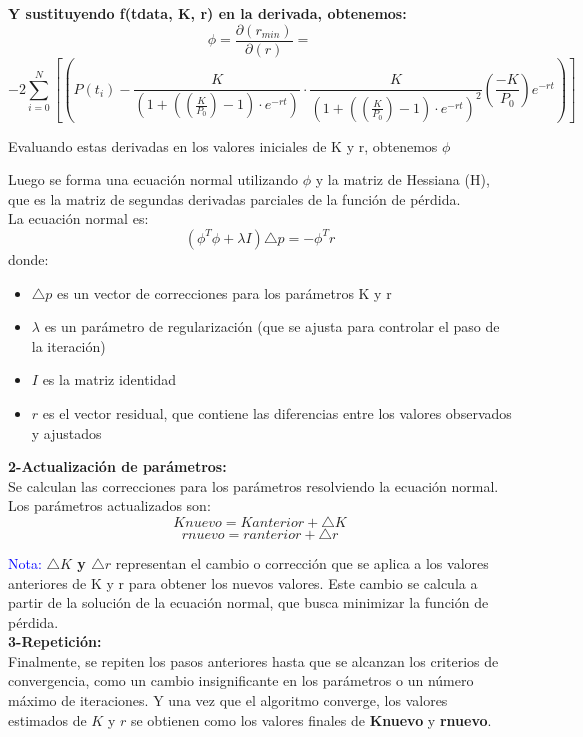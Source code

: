 \documentclass[a4paper,10pt,twocolumn]{article}
\begin{document}
\small{\textbf{Y sustituyendo  f(tdata, K, r) en la derivada, obtenemos:}}
$$\phi = \frac{\partial(r_{min})}{\partial(r)} = $$
\tiny{$$-2\sum_{i=0}^{N}[(P(t_{i})-\frac{K}{(1+((\frac{K}{P_{0}})-1)\cdot e^{-rt})} \cdot \frac{K}{(1+((\frac{K}{P_{0}})-1) \cdot e^{-rt})^{2}}(\frac{-K}{P_{0}})e^{-rt})]$$}

\small{Evaluando estas derivadas en los valores iniciales de K y r, obtenemos $\phi$}

Luego se forma una ecuación normal utilizando $\phi$ y la matriz de Hessiana (H), que es la matriz de segundas derivadas parciales de la función de pérdida.\\La ecuación normal es:
$$(\phi^{T}\phi + \lambda I)\triangle p = -\phi^{T} r$$
donde:
	\begin{itemize}
		\item $\triangle p$ es un vector de correcciones para los parámetros K y r
		\item $\lambda$ es un parámetro de regularización (que se ajusta para controlar el paso de la iteración)
		\item $I$ es la matriz identidad
		\item $r$ es el vector residual, que contiene las diferencias entre los valores observados y ajustados
	\end{itemize}
\small{\textbf{2-Actualización de parámetros:}}\\
Se calculan las correcciones para los parámetros resolviendo la ecuación normal. \\
Los parámetros actualizados son:
	$$Knuevo = Kanterior + \triangle K$$
	$$rnuevo = ranterior + \triangle r$$

\textcolor{blue}{Nota:} \textbf{$\triangle K$ y $\triangle r$} representan el cambio o corrección que se aplica a los valores anteriores de K y r para obtener los nuevos valores. Este cambio se calcula a partir de la solución de la ecuación normal, que busca minimizar la función de pérdida.\\

\small{\textbf{3-Repetición:}}\\
Finalmente, se repiten los pasos anteriores hasta que se alcanzan los criterios de convergencia, como un cambio insignificante en los parámetros o un número máximo de iteraciones. Y una vez que el algoritmo converge, los valores estimados de $K$ y $r$ se obtienen como los valores finales de \textbf{Knuevo} y \textbf{rnuevo}.
\end{document}
